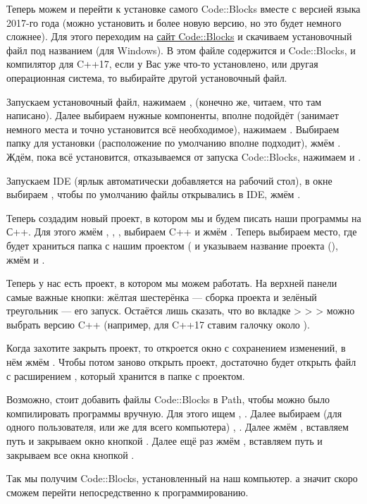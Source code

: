 Теперь можем и перейти к установке самого Code::Blocks вместе с версией языка 2017-го года (можно установить и более новую версию, но это будет немного сложнее). Для этого переходим на \href{https://www.codeblocks.org/downloads/binaries/}{сайт Code::Blocks} и скачиваем установочный файл под названием  (для Windows). В этом файле содержится и Code::Blocks, и компилятор для C++17, если у Вас уже что-то установлено, или другая операционная система, то выбирайте другой установочный файл. 

Запускаем установочный файл, нажимаем ,  (конечно же, читаем, что там написано). Далее выбираем нужные компоненты, вполне подойдёт  (занимает немного места и точно установится всё необходимое), нажимаем . Выбираем папку для установки (расположение по умолчанию вполне подходит), жмём . Ждём, пока всё установится, отказываемся от запуска Code::Blocks, нажимаем  и . 

Запускаем IDE (ярлык автоматически добавляется на рабочий стол), в окне  выбираем , чтобы по умолчанию файлы открывались в IDE, жмём .

Теперь создадим новый проект, в котором мы и будем писать наши программы на С++. Для этого жмём , , , выбираем C++ и жмём . Теперь выбираем место, где будет храниться папка с нашим проектом ( и указываем название проекта (), жмём  и .

Теперь у нас есть проект, в котором мы можем работать. На верхней панели самые важные кнопки: жёлтая шестерёнка — сборка проекта и зелёный треугольник — его запуск. Остаётся лишь сказать, что во вкладке  >  >  >  можно выбрать версию C++ (например, для C++17 ставим галочку около ).

Когда захотите закрыть проект, то откроется окно с сохранением изменений, в нём жмём . Чтобы потом заново открыть проект, достаточно будет открыть файл с расширением , который хранится в папке с проектом.

Возможно, стоит добавить файлы Code::Blocks в Path, чтобы можно было компилировать программы вручную. Для этого ищем , . Далее выбираем (для одного пользователя, или же для всего компьютера) , . Далее жмём , вставляем путь  и закрываем окно кнопкой . Далее ещё раз жмём , вставляем путь  и закрываем все окна кнопкой .

Так мы получим Code::Blocks, установленный на наш компьютер. а значит скоро сможем перейти непосредственно к программированию.
